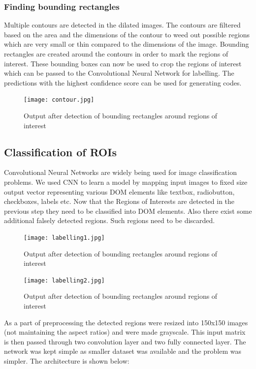       \subsubsection{Finding bounding rectangles}
        Multiple contours are detected in the dilated images. The contours are filtered based on the area and the dimensions of the contour to weed out possible regions which are very small or thin compared to the dimensions of the image. Bounding rectangles are created around the contours in order to mark the regions of interest. These bounding boxes can now be used to crop the regions of interest which can be passed to the Convolutional Neural Network for labelling. The predictions with the highest confidence score can be used for generating codes.
        \begin{figure}[H]
      		\centering
      		\texttt{[image: contour.jpg]}
      		\caption
      		{Output after detection of bounding rectangles around regions of interest}
      	\end{figure}

    \subsection{Classification of ROIs}
      Convolutional Neural Networks are widely being used for image classification problems. We used CNN to learn a model by mapping input images to fixed size output vector representing various DOM elements like textbox, radiobutton, checkboxes, labels etc. Now that the Regions of Interests are detected in the previous step they need to be classified into DOM elements. Also there exist some additional falsely detected regions. Such regions need to be discarded.
      \begin{figure}[H]
        \centering
        \texttt{[image: labelling1.jpg]}
        \caption
        {Output after detection of bounding rectangles around regions of interest}
      \end{figure}

      \begin{figure}[H]
        \centering
        \texttt{[image: labelling2.jpg]}
        \caption
        {Output after detection of bounding rectangles around regions of interest}
      \end{figure}

      As a part of preprocessing the detected regions were resized into 150x150 images (not maintaining the aspect ratios) and were made grayscale. This input matrix is then passed through two convolution layer and two fully connected layer. The network was kept simple as smaller dataset was available and the problem was simpler. The architecture is shown below:

